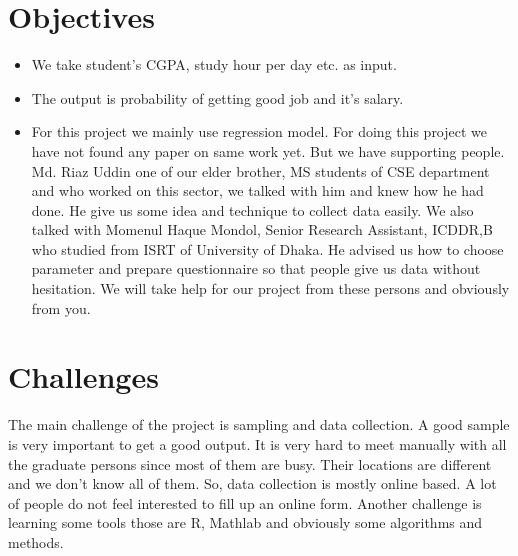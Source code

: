 \documentclass{report}
\begin{document}
\section*{Objectives}
\begin{itemize}
\item We take student's CGPA, study hour per day etc. as input.
\item The output is probability of getting good job and it's salary.
\item For this project we mainly use regression model. For doing this project we have not found any paper on same work yet. But we have supporting people. Md. Riaz Uddin one of our elder brother, MS students of CSE department and who worked on this sector, we talked with him and knew how he had done. He give us some idea and technique to collect data easily. We also talked with Momenul Haque Mondol, Senior Research Assistant, ICDDR,B who studied from ISRT of University of Dhaka. He advised us how to choose parameter and prepare questionnaire so that people give us data without hesitation. We will take help for our project from these persons and obviously from you.
\end{itemize}

\section*{Challenges}
The main challenge of the project is sampling and data collection. A good sample is very important to get a good output. It is very hard to meet manually with all the graduate persons since most of them are busy. Their locations are different and we don't know all of them. So, data collection is mostly online based. A lot of people do not feel interested to fill up an online form. Another challenge is learning some tools those are R, Mathlab and obviously some algorithms and methods.
\end{document}
